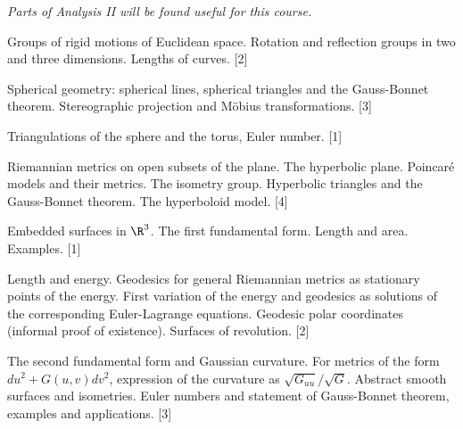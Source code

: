 \documentclass[a4paper]{article}
\begin{document}
\maketitle
{\small
\noindent\emph{Parts of Analysis II will be found useful for this course.}
\vspace{10pt}

\noindent Groups of rigid motions of Euclidean space. Rotation and reflection groups in two and three dimensions. Lengths of curves.\hspace*{\fill} [2]

\vspace{5pt}
\noindent Spherical geometry: spherical lines, spherical triangles and the Gauss-Bonnet theorem. Stereographic projection and M\"obius transformations.\hspace*{\fill} [3]

\vspace{5pt}
\noindent Triangulations of the sphere and the torus, Euler number.\hspace*{\fill} [1]

\vspace{5pt}
\noindent Riemannian metrics on open subsets of the plane. The hyperbolic plane. Poincar\'e models and their metrics. The isometry group. Hyperbolic triangles and the Gauss-Bonnet theorem. The hyperboloid model.\hspace*{\fill} [4]

\vspace{5pt}
\noindent Embedded surfaces in $\R^3$. The first fundamental form. Length and area. Examples.\hspace*{\fill} [1]

\vspace{5pt}
\noindent Length and energy. Geodesics for general Riemannian metrics as stationary points of the energy. First variation of the energy and geodesics as solutions of the corresponding Euler-Lagrange equations. Geodesic polar coordinates (informal proof of existence). Surfaces of revolution.\hspace*{\fill} [2]

\vspace{5pt}
\noindent The second fundamental form and Gaussian curvature. For metrics of the form $du^2 + G(u, v) dv^2$, expression of the curvature as $\sqrt{G_{uu}}/\sqrt{G}$. Abstract smooth surfaces and isometries. Euler numbers and statement of Gauss-Bonnet theorem, examples and applications.\hspace*{\fill} [3]}
\end{document}
